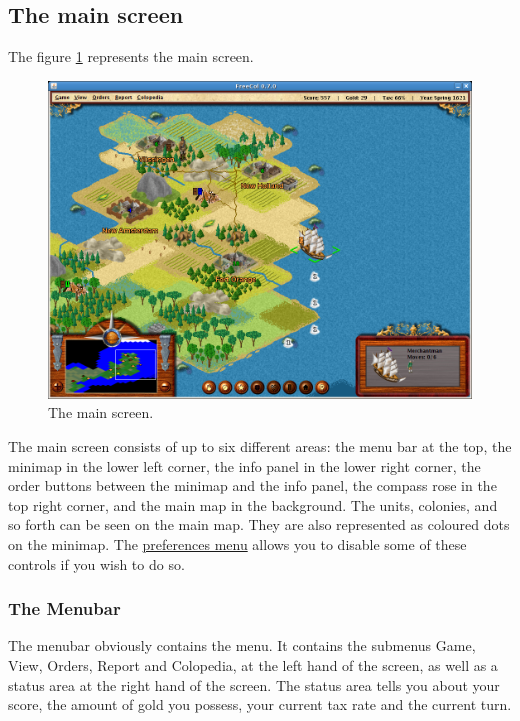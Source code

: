 \documentclass[12pt]{article}
\begin{document}
\hypertarget{main screen}{\subsection{The main screen}}

The figure \ref{main_screen_fig} represents the main screen.
\begin{figure}[htb]
  \begin{center}
    \includegraphics[scale=0.35]{images/main_screen.png}
    \caption{The main screen.\label{main_screen_fig}}
  \end{center}
\end{figure}

The main screen consists of up to six different areas: the menu bar at
the top, the minimap in the lower left corner, the info panel in the
lower right corner, the order buttons between the minimap and the info
panel, the compass rose in the top right corner, and the main map in
the background. The units, colonies, and so forth can be seen on the
main map. They are also represented as coloured dots on the minimap.
The \hyperlink{Client options}{preferences menu} allows you to disable
some of these controls if you wish to do so.

\hypertarget{menubar}{\subsubsection{The Menubar}}

The menubar obviously contains the menu. It contains the submenus
Game, View, Orders, Report and Colopedia, at the left hand of the
screen, as well as a status area at the right hand of the screen. The
status area tells you about your score, the amount of gold you
possess, your current tax rate and the current turn.
\end{document}
